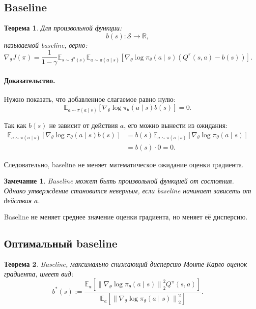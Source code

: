\documentclass[12pt,a4paper]{article}
\newtheorem{theorem}{Теорема}
\newtheorem{remark}{Замечание}
\begin{document}
\subsection{Baseline}

\begin{theorem}
Для произвольной функции:
\[
b(s):\mathcal S\to\mathbb R,
\]
называемой baseline, верно:
\[
\nabla_\theta J(\pi)
=
\frac{1}{1-\gamma}
\mathbb E_{s\sim d^\pi(s)}
\mathbb E_{a\sim\pi(a\mid s)}
\left[
\nabla_\theta
\log \pi_\theta(a\mid s)
\left(
Q^\pi(s,a)-b(s)
\right)
\right].
\]
\end{theorem}

\paragraph{Доказательство.}

Нужно показать, что добавленное слагаемое равно нулю:
\[
\mathbb E_{a\sim\pi(a\mid s)}
\left[
\nabla_\theta
\log \pi_\theta(a\mid s)
b(s)
\right]
=
0.
\]

Так как $b(s)$ не зависит от действия $a$, его можно вынести из ожидания:
\[
\begin{aligned}
\mathbb E_{a\sim\pi(a\mid s)}
\left[
\nabla_\theta
\log \pi_\theta(a\mid s)
b(s)
\right]
&=
b(s)
\mathbb E_{a\sim\pi(a\mid s)}
\left[
\nabla_\theta
\log \pi_\theta(a\mid s)
\right]
\\
&=
b(s)\cdot 0
=
0.
\end{aligned}
\]

Следовательно, baseline не меняет математическое ожидание оценки градиента.

\begin{remark}
Baseline может быть произвольной функцией от состояния. Однако утверждение становится неверным, если baseline начинает зависеть от действия $a$.
\end{remark}

Baseline не меняет среднее значение оценки градиента, но меняет её дисперсию.

\subsection{Оптимальный baseline}

\begin{theorem}
Baseline, максимально снижающий дисперсию Монте-Карло оценок градиента, имеет вид:
\[
b^\ast(s)
:=
\frac{
\mathbb E_a
\left[
\left\|
\nabla_\theta
\log \pi_\theta(a\mid s)
\right\|_2^2
Q^\pi(s,a)
\right]
}{
\mathbb E_a
\left[
\left\|
\nabla_\theta
\log \pi_\theta(a\mid s)
\right\|_2^2
\right]
}.
\]
\end{theorem}
\end{document}
